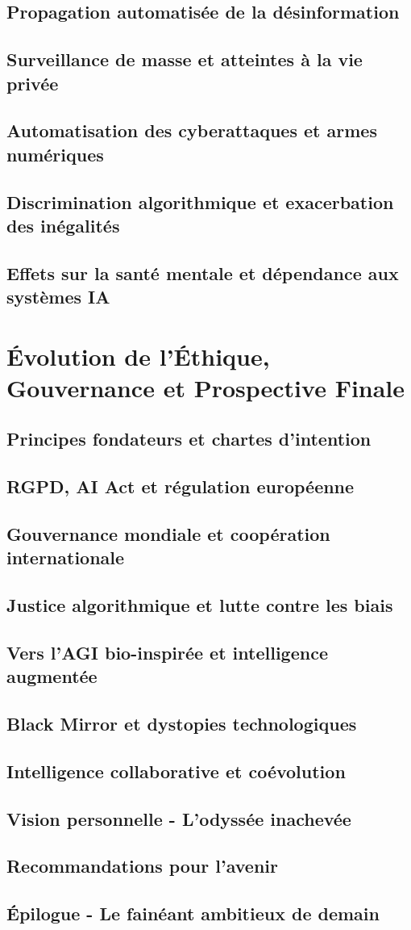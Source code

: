 \documentclass[12pt,a4paper]{book}
\begin{document}
\section{Propagation automatisée de la désinformation}
\section{Surveillance de masse et atteintes à la vie privée}
\section{Automatisation des cyberattaques et armes numériques}
\section{Discrimination algorithmique et exacerbation des inégalités}
\section{Effets sur la santé mentale et dépendance aux systèmes IA}

\chapter{Évolution de l'Éthique, Gouvernance et Prospective Finale}
\section{Principes fondateurs et chartes d'intention}
\section{RGPD, AI Act et régulation européenne}
\section{Gouvernance mondiale et coopération internationale}
\section{Justice algorithmique et lutte contre les biais}
\section{Vers l'AGI bio-inspirée et intelligence augmentée}
\section{Black Mirror et dystopies technologiques}
\section{Intelligence collaborative et coévolution}
\section{Vision personnelle - L'odyssée inachevée}
\section{Recommandations pour l'avenir}
\section{Épilogue - Le fainéant ambitieux de demain}
\end{document}
